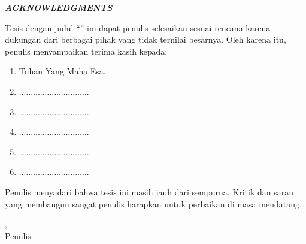 \thispagestyle{plain}
\begin{center}
{\bfseries\itshape\large ACKNOWLEDGMENTS}
\end{center}

\vspace{1cm}

Tesis dengan judul ``\TitleID'' ini dapat penulis selesaikan sesuai rencana karena dukungan dari berbagai pihak yang tidak ternilai besarnya. Oleh karena itu, penulis menyampaikan terima kasih kepada:

\begin{enumerate}
    \item Tuhan Yang Maha Esa.
    \item ..............................
    \item ..............................
    \item ..............................
    \item ..............................
    \item ..............................
\end{enumerate}

\vspace{1cm}
Penulis menyadari bahwa tesis ini masih jauh dari sempurna. Kritik dan saran yang membangun sangat penulis harapkan untuk perbaikan di masa mendatang.

\vspace{1.5cm}

\begin{flushright}
{\ApprovalPlace},\ \ApprovalDate\\[1.5cm]
Penulis
\end{flushright}
\clearpage